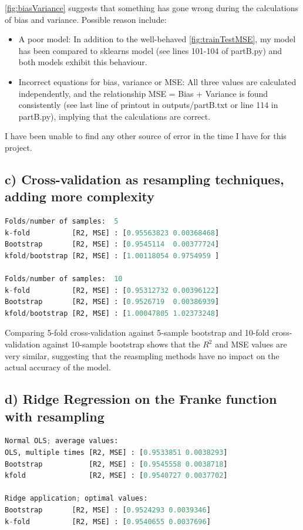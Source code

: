\documentclass[a4paper, UKenglish]{article}
\newcommand{\0}{\mathbf{0}}
\newcommand{\1}{\mathbf{1}}
\begin{document}
\autoref{fig:biasVariance} suggests that something has gone wrong during the calculations of bias and variance. Possible reason include:
\begin{itemize}
\item A poor model: In addition to the well-behaved \autoref{fig:trainTestMSE}, my model has been compared to sklearns model (see lines 101-104 of partB.py) and both models exhibit this behaviour.
\item Incorrect equations for bias, variance or MSE: All three values are calculated independently, and the relationship MSE = Bias + Variance is found consistently (see last line of printout in outputs/partB.txt or line 114 in partB.py), implying that the calculations are correct.
\end{itemize}
I have been unable to find any other source of error in the time I have for this project.


\subsection{c) Cross-validation as resampling techniques, adding more complexity}

\begin{lstlisting}[language=python]
Folds/number of samples:  5
k-fold          [R2, MSE] : [0.95563823 0.00368468]
Bootstrap       [R2, MSE] : [0.9545114  0.00377724]
kfold/bootstrap [R2, MSE] : [1.00118054 0.9754959 ]

Folds/number of samples:  10
k-fold          [R2, MSE] : [0.95312732 0.00396122]
Bootstrap       [R2, MSE] : [0.9526719  0.00386939]
kfold/bootstrap [R2, MSE] : [1.00047805 1.02373248]
\end{lstlisting}

Comparing 5-fold cross-validation against 5-sample bootstrap and 10-fold cross-validation against 10-sample bootstrap shows that the $R^2$ and MSE values are very similar, suggesting that the reasmpling methods have no impact on the actual accuracy of the model. 

\subsection{d) Ridge Regression on the Franke function with resampling}
\begin{lstlisting}[language=python]
Normal OLS; average values:
OLS, multiple times [R2, MSE] : [0.9533851 0.0038293]
Bootstrap           [R2, MSE] : [0.9545558 0.0038718]
kfold               [R2, MSE] : [0.9540727 0.0037702]

Ridge application; optimal values:
Bootstrap       [R2, MSE] : [0.9524293 0.0039346]
k-fold          [R2, MSE] : [0.9540655 0.0037696]
\end{lstlisting}
\end{document}
